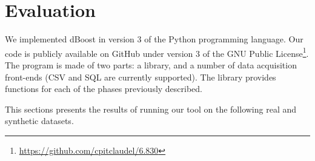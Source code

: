 \section{Evaluation}
\label{sec:evaluation}

We implemented dBoost in version 3 of the Python programming language. Our code is publicly available on GitHub under version 3 of the GNU Public License\footnote{\url{https://github.com/cpitclaudel/6.830}}. The program is made of two parts: a library, and a number of data acquisition front-ends (CSV and SQL are currently supported). The library provides functions for each of the phases previously described.



%

This sections presents the results of running our tool on the following real and synthetic datasets.

